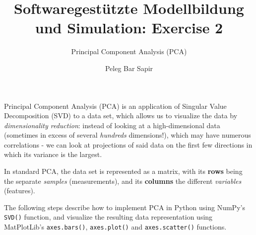 \documentclass[12pt]{scrartcl}
\title{Softwaregestützte Modellbildung und Simulation: Exercise 2}
\subtitle{Principal Component Analysis (PCA)}
\author{Peleg Bar Sapir}
\newcommand{\pyinl}[1]{\texttt{#1}}
\begin{document}
\maketitle

Principal Component Analysis (PCA) is an application of Singular Value Decomposition (SVD) to a data set, which allows us to visualize the data by \textit{dimensionality reduction}: instead of looking at a high-dimensional data (sometimes in excess of several \textit{hundreds} dimensions!), which may have numerous correlations - we can look at projections of said data on the first few directions in which its variance is the largest.

In standard PCA, the data set is represented as a matrix, with its \textbf{rows} being the separate \textit{samples} (measurements), and its \textbf{columns} the different \textit{variables} (features).

The following steps describe how to implement PCA in Python using NumPy's \pyinl{SVD()} function, and visualize the resulting data representation using MatPlotLib's \pyinl{axes.bars()}, \pyinl{axes.plot()} and \pyinl{axes.scatter()} functions.
\end{document}
